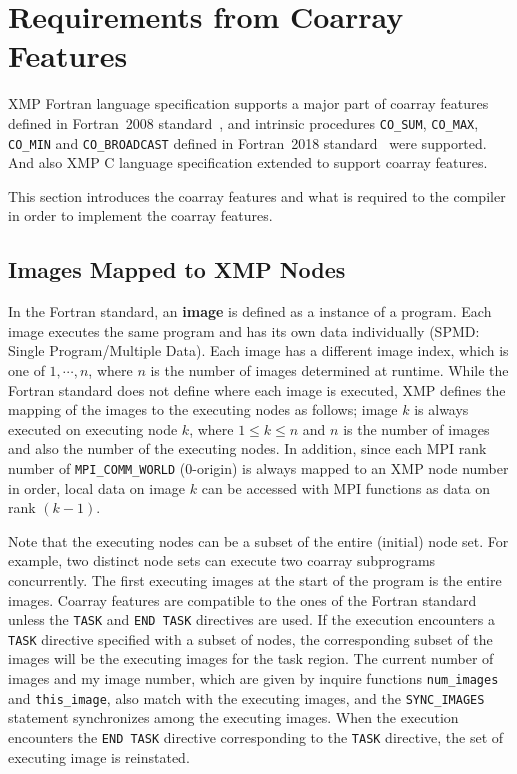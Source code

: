 \section{Requirements from Coarray Features}\label{sec:lang}

XMP Fortran language specification supports a major part of coarray features defined in 
Fortran~2008 standard~\cite{F08}, and intrinsic procedures 
{\tt CO\_SUM}, {\tt CO\_MAX}, {\tt CO\_MIN} and {\tt CO\_BROADCAST} defined in 
Fortran~2018 standard~\cite{F18} were supported.
And also XMP C language specification extended to support coarray features.

This section introduces the coarray features and what is required
to the compiler in order to implement the coarray features.


\subsection{Images Mapped to XMP Nodes}

In the Fortran standard, an {\bf image} is defined as a instance of a program. 
Each image executes the same program and has its own data individually 
(SPMD: Single Program/Multiple Data).
Each image has a different image index, which is one of $1, \cdots, n$, 
where $n$ is the number of images determined at runtime. 
While the Fortran standard does not define where each image is executed, 
XMP defines the mapping of the images to the executing nodes as follows;
image $k$ is always executed on executing node $k$, 
where $1 \leq k \leq n$ and 
$n$ is the number of images and also the number of the executing nodes. 
In addition, since each MPI rank number of {\tt MPI\_COMM\_WORLD} (0-origin) is 
always mapped to an XMP node number in order, local data on image $k$ can be
accessed with MPI functions as data on rank $(k - 1)$.

Note that the executing nodes can be a subset of the entire (initial) node set. 
For example, two distinct node sets can execute two coarray subprograms concurrently.
The first executing images at the start of the program is the entire images.
Coarray features are compatible to the ones of the Fortran standard unless 
the {\tt TASK} and {\tt END TASK} directives are used.
If the execution encounters a {\tt TASK} directive specified with a subset of nodes, 
the corresponding subset of the images will be the executing images for the task region. 
The current number of images and my image number, which are given by inquire functions
{\tt num\_images} and {\tt this\_image}, also match with the executing images, and
the {\tt SYNC\_IMAGES} statement synchronizes among the executing images.
When the execution encounters the {\tt END TASK} directive corresponding to the
{\tt TASK} directive, the set of executing image is reinstated.

